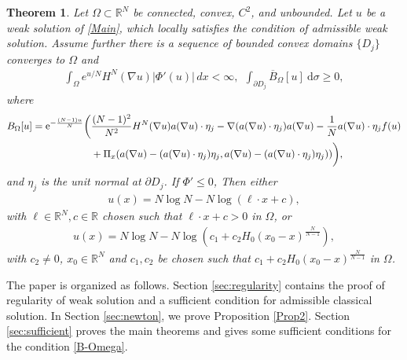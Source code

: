 \documentclass[reqno, 11pt]{amsart} %
\numberwithin{equation}{section}
\newtheorem{thm}{Theorem}[section]
\newtheorem{cor}[thm]{Corollary}
\theoremstyle{definition}
\newcommand{\pa}{\partial}
\newcommand{\R}{\mathbb{R}}
\newcommand{\e}{\textup{e}}
\newcommand{\RRC}{\operatorname{RRC}}
\begin{document}
\begin{thm}\label{thm:unbounded}
Let $\Omega\subset\mathbb R^N$ be connected, convex, $C^2$, and unbounded. Let $u$ be a weak solution of
\eqref{Main}, which locally satisfies the condition of admissible weak solution. Assume further  there is a sequence of bounded convex domains $\{D_j\}$ converges to $\Omega$ and
\begin{align}\label{unbounded-assumption}
    \int_\Omega e^{u/N}H^N(\nabla u)|\Phi'(u)|\,dx<\infty, \ \ \int_{\pa D_j} \overline{B}_{\Omega}[u] \ \text{d} \sigma \geq 0,
\end{align}
where
\begin{align}\label{eq:overlineBOmega}
    B_{\Omega}[u] = \e^{-\frac{(N-1)u}{N}} \bigg( & \frac{(N-1)^2}{N^2} H^N(\nabla u) a(\nabla u) \cdot \eta_j - \nabla (a(\nabla u) \cdot \eta_j) a(\nabla u )  - \frac{1}{N} a(\nabla u) \cdot \eta_j f(u) \nonumber \\
    & + \Pi_x(a(\nabla u) - (a(\nabla u) \cdot  \eta_j) \eta_j, a(\nabla u) - (a(\nabla u) \cdot  \eta_j) \eta_j)) \bigg),
\end{align}
and $\eta_j$ is the unit normal at $\pa D_j$. If $\Phi'\le0$, Then either
    \begin{align}\label{linear-log+}
        u(x) = N \log N - N \log (\ell \cdot x + c),
    \end{align}
    with $\ell \in \R^N, c \in \R$ chosen such that $\ell \cdot x + c > 0 $ in $\Omega$, or
    \begin{align}\label{bubble-log+}
        u(x) = N \log N - N \log (c_1 + c_2 H_0( x_0 -x )^{\frac{N}{N-1}}),
    \end{align}
    with $c_2 \neq 0$, $x_0 \in \R^N$ and $c_1, c_2$ be chosen such that $c_1 + c_2 H_0(x_0-x)^{\frac{N}{N-1}} $ in $\Omega$.
\end{thm}



The paper is organized as follows. Section \ref{sec:regularity} contains the proof of regularity of weak solution and a sufficient condition for admissible classical solution. In Section \ref{sec:newton}, we prove Proposition \ref{Prop2}. Section \ref{sec:sufficient} proves the main theorems and gives some sufficient conditions for the condition \eqref{B-Omega}.
\end{document}
